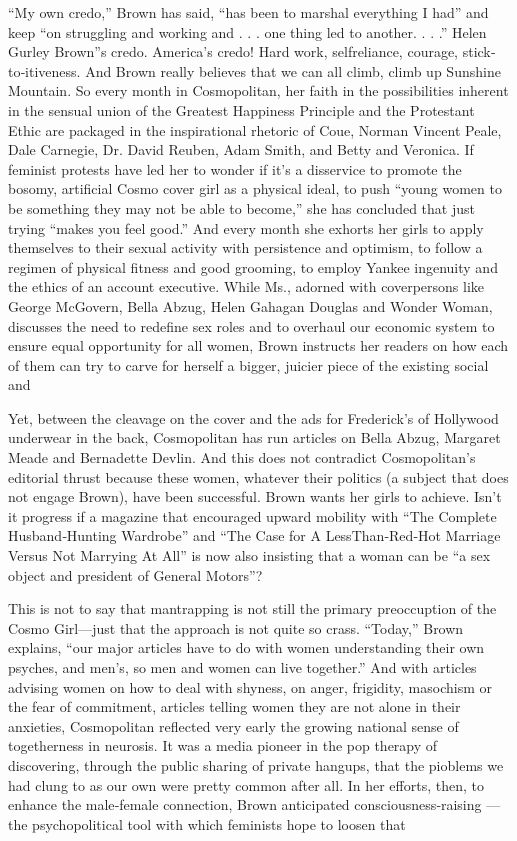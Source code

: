 ``My own credo,'' Brown has said, ``has been to marshal everything I
had'' and keep ``on struggling and working and . . . one thing led to
another. . . .'' Helen Gurley Brown''s credo. America's credo! Hard
work, selfreliance, courage, stick‐to‐itiveness. And Brown really
believes that we can all climb, climb up Sunshine Mountain. So every
month in Cosmopolitan, her faith in the possibilities inherent in the
sensual union of the Greatest Happiness Principle and the Protestant
Ethic are packaged in the inspirational rhetoric of Coue, Norman Vincent
Peale, Dale Carnegie, Dr. David Reuben, Adam Smith, and Betty and
Veronica. If feminist protests have led her to wonder if it's a
disservice to promote the bosomy, artificial Cosmo cover girl as a
physical ideal, to push ``young women to be something they may not be
able to become,'' she has concluded that just trying ``makes you feel
good.'' And every month she exhorts her girls to apply themselves to
their sexual activity with persistence and optimism, to follow a regimen
of physical fitness and good grooming, to employ Yankee ingenuity and
the ethics of an account executive. While Ms., adorned with coverpersons
like George McGovern, Bella Abzug, Helen Gahagan Douglas and Wonder
Woman, discusses the need to redefine sex roles and to overhaul our
economic system to ensure equal opportunity for all women, Brown
instructs her readers on how each of them can try to carve for herself a
bigger, juicier piece of the existing social and

Yet, between the cleavage on the cover and the ads for Frederick's of
Hollywood underwear in the back, Cosmopolitan has run articles on Bella
Abzug, Margaret Meade and Bernadette Devlin. And this does not
contradict Cosmopolitan's editorial thrust because these women, whatever
their politics (a subject that does not engage Brown), have been
successful. Brown wants her girls to achieve. Isn't it progress if a
magazine that encouraged upward mobility with ``The Complete
Husband‐Hunting Wardrobe'' and ``The Case for A LessThan‐Red‐Hot
Marriage Versus Not Marrying At All'' is now also insisting that a woman
can be ``a sex object and president of General Motors''?

This is not to say that mantrapping is not still the primary
preoccuption of the Cosmo Girl---just that the approach is not quite so
crass. ``Today,'' Brown explains, ``our major articles have to do with
women understanding their own psyches, and men's, so men and women can
live together.'' And with articles advising women on how to deal with
shyness, on anger, frigidity, masochism or the fear of commitment,
articles telling women they are not alone in their anxieties,
Cosmopolitan reflected very early the growing national sense of
togetherness in neurosis. It was a media pioneer in the pop therapy of
discovering, through the public sharing of private hangups, that the
pioblems we had clung to as our own were pretty common after all. In her
efforts, then, to enhance the male‐female connection, Brown anticipated
consciousness‐raising --- the psychopolitical tool with which feminists
hope to loosen that

